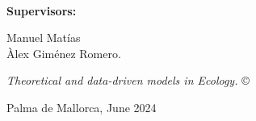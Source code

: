 \documentclass[
	11pt, %
	a4paper, %
]{LegrandOrangeBook}
\begin{document}







\thispagestyle{empty} %

~\vfill %
\sffamily

\noindent \textbf{Supervisors:}

\noindent Manuel Matías \\

\noindent Àlex Giménez Romero.

\noindent \textit{Theoretical and data-driven models in Ecology.} \copyright

\noindent Palma de Mallorca, June 2024
\pagebreak


\newpage
\thispagestyle{plain} %
\mbox{}


\newpage
\thispagestyle{plain} %
\mbox{}

\newpage
\thispagestyle{plain} %
\mbox{}



\newpage
\thispagestyle{plain} %
\mbox{}
\end{document}
